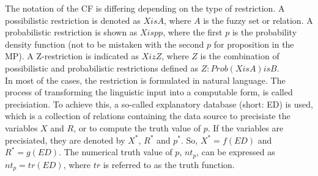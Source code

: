 \documentclass[conference]{IEEEtran}
\begin{document}
The notation of the CF is differing depending on the type of restriction. A possibilistic restriction is denoted as \begin{math} X is A \end{math}, where \begin{math} A \end{math} is the fuzzy set or relation. A probabilistic restriction is shown as \begin{math} X isp p \end{math}, where the first \begin{math} p \end{math} is the probability density function (not to be mistaken with the second \begin{math} p \end{math} for proposition in the MP). A Z-restriction is indicated as \begin{math} X iz Z \end{math}, where \begin{math} Z \end{math} is the combination of possibilistic and probabilistic restrictions defined as \begin{math} Z: Prob(X is A) is B \end{math}.\\
In most of the cases, the restriction is formulated in natural language. The process of transforming the linguistic input into a computable form, is called precisiation. To achieve this, a so-called explanatory database (short: ED) is used, which is a collection of relations containing the data source to precisiate the variables \begin{math} X \end{math} and \begin{math} R \end{math}, or to compute the truth value of \begin{math} p \end{math}. If the variables are precisiated, they are denoted by \begin{math} X^{*} \end{math}, \begin{math} R^{*} \end{math} and \begin{math}p^{*} \end{math}. So, \begin{math} X^{*}=f(ED) \end{math} and \begin{math} R^{*}=g(ED) \end{math}. The numerical truth value of \begin{math} p \end{math}, \begin{math}nt_{p} \end{math}, can be expressed as \begin{math} nt_{p}=tr(ED) \end{math}, where \begin{math} tr \end{math} is referred to as the truth function.
\end{document}
